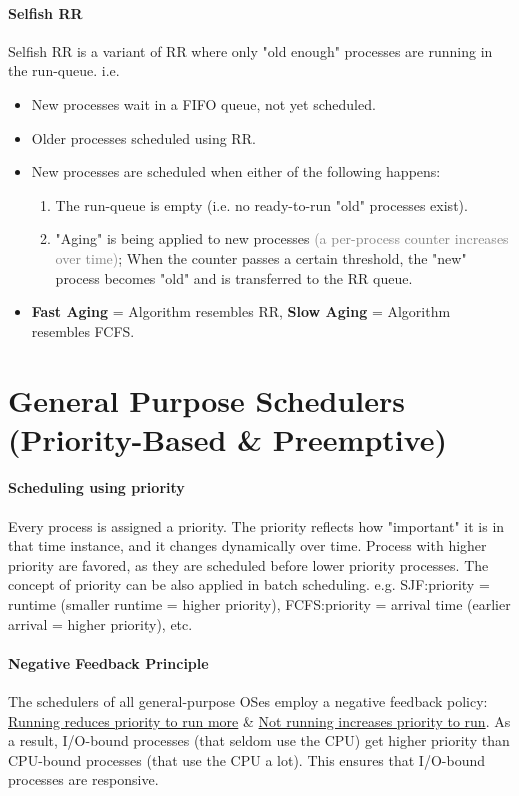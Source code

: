 \documentclass[openany,12pt]{book}
\newcommand{\gray}[1]{\textcolor{gray}{#1}}
\begin{document}
\paragraph{Selfish RR} Selfish RR is a variant of RR where only "old enough" processes are running in the run-queue. i.e.
\begin{itemize}
    \item New processes wait in a FIFO queue, not yet scheduled.
    \item Older processes scheduled using RR.
    \item New processes are scheduled when either of the following happens:
          \begin{enumerate}
              \item The run-queue is empty (i.e. no ready-to-run "old" processes exist).
              \item "Aging" is being applied to new processes \gray{(a per-process counter increases over time)}; When the counter passes a certain threshold, the "new" process becomes "old" and is transferred to the RR queue.
          \end{enumerate}
    \item \textbf{Fast Aging} = Algorithm resembles RR, \textbf{Slow Aging} = Algorithm resembles FCFS.
\end{itemize}


\section*{General Purpose Schedulers (Priority-Based \& Preemptive)}

\paragraph{Scheduling using priority} Every process is assigned a priority. The priority reflects how "important" it is in that time instance, and it changes dynamically over time. Process with higher priority are favored, as they are scheduled before lower priority processes. The concept of priority can be also applied in batch scheduling. e.g. SJF:priority = runtime (smaller runtime = higher priority), FCFS:priority = arrival time (earlier arrival = higher priority), etc.

\paragraph{Negative Feedback Principle} The schedulers of all general-purpose OSes employ a negative feedback policy: \ul{Running reduces priority to run more} \& \ul{Not running increases priority to run}.
As a result, I/O-bound processes (that seldom use the CPU) get higher priority than CPU-bound processes (that use the CPU a lot). This ensures that I/O-bound processes are responsive.
\end{document}
